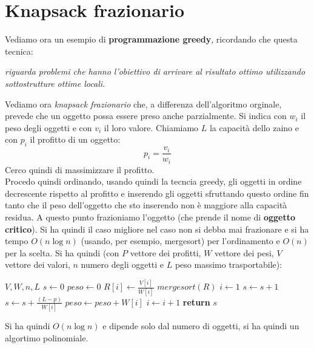\documentclass[a4paper,12pt, oneside]{book}
\begin{document}
\section{Knapsack frazionario}
Vediamo ora un esempio di \textbf{programmazione greedy}, ricordando
che questa tecnica:
\begin{algorithm}
  \textit{riguarda problemi che hanno l’obiettivo di arrivare al
    risultato ottimo utilizzando sottostrutture ottime locali.}
\end{algorithm}
Vediamo ora \textit{knapsack frazionario} che, a differenza
dell'algoritmo orginale, prevede che un oggetto possa essere preso
anche parzialmente. Si indica con $w_i$ il peso degli oggetti e con
$v_i$ il loro valore. Chiamiamo $L$ la capacità dello zaino e con
$p_i$ il profitto di un oggetto:
\[p_i=\frac{v_i}{w_i}\]
Cerco quindi di massimizzare il profitto.\\
Procedo quindi ordinando, usando quindi la tecncia greedy, gli oggetti
in ordine decrescente rispetto al profitto e inserendo gli oggetti
sfruttando questo ordine fin tanto che il peso dell'oggetto che sto
inserendo non è maggiore alla capacità residua. A questo punto
frazioniamo l'oggetto (che prende il nome di \textbf{oggetto
  critico}). Si ha quindi il caso migliore nel caso non si debba mai
frazionare e si ha tempo $O(n\log n)$ (usando, per esempio, mergesort)
per l'ordinamento e $O(n)$ per la scelta.
\newpage
Si ha quindi (con $P$
vettore dei profitti, $W$ vettore dei pesi, $V$ vettore dei valori,
$n$ numero degli oggetti e $L$ peso massimo trasportabile):
\begin{algorithm}[H]
  \begin{algorithmic}
     {$V,W,n,L$}
    \State $s\gets 0$
    \State $peso\gets 0$
    \State
    \State $R[i]\gets \frac{V[i]}{W[i]}$
    \EndFor
    \State $mergesort(R)$
    \State $i\gets 1$
    \State $s\gets s+1$
    \Else
    \State $s\gets s+\frac{(L-p)}{W[i]}$
    \EndIf
    \State $peso\gets peso+W[i]$
    \State $i\gets i+1$
    \EndWhile
    \State \textbf{return} $s$
    \EndFunction
  \end{algorithmic}
\end{algorithm}
Si ha quindi $O(n\log n)$ e dipende solo dal numero di oggetti, si ha
quindi un algortimo polinomiale.
\end{document}
